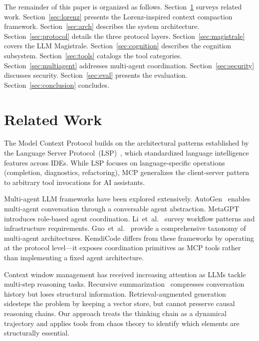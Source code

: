 \documentclass[journal,10pt]{IEEEtran}
\begin{document}
The remainder of this paper is organized as follows. Section~\ref{sec:related} surveys related work. Section~\ref{sec:lorenz} presents the Lorenz-inspired context compaction framework. Section~\ref{sec:arch} describes the system architecture. Section~\ref{sec:protocol} details the three protocol layers. Section~\ref{sec:magistrale} covers the LLM Magistrale. Section~\ref{sec:cognition} describes the cognition subsystem. Section~\ref{sec:tools} catalogs the tool categories. Section~\ref{sec:multiagent} addresses multi-agent coordination. Section~\ref{sec:security} discusses security. Section~\ref{sec:eval} presents the evaluation. Section~\ref{sec:conclusion} concludes.

\section{Related Work}
\label{sec:related}

The Model Context Protocol builds on the architectural patterns established by the Language Server Protocol~(LSP)~\cite{lsp2016}, which standardized language intelligence features across IDEs. While LSP focuses on language-specific operations (completion, diagnostics, refactoring), MCP generalizes the client-server pattern to arbitrary tool invocations for AI assistants.

Multi-agent LLM frameworks have been explored extensively. AutoGen~\cite{wu2023autogen} enables multi-agent conversation through a conversable agent abstraction. MetaGPT~\cite{hong2023metagpt} introduces role-based agent coordination. Li~et~al.~\cite{li2024multiagent} survey workflow patterns and infrastructure requirements. Guo~et~al.~\cite{guo2024ijcai} provide a comprehensive taxonomy of multi-agent architectures. KemdiCode differs from these frameworks by operating at the protocol level---it exposes coordination primitives as MCP tools rather than implementing a fixed agent architecture.

Context window management has received increasing attention as LLMs tackle multi-step reasoning tasks. Recursive summarization~\cite{wu2021recursively} compresses conversation history but loses structural information. Retrieval-augmented generation~\cite{lewis2020rag} sidesteps the problem by keeping a vector store, but cannot preserve causal reasoning chains. Our approach treats the thinking chain as a dynamical trajectory and applies tools from chaos theory to identify which elements are structurally essential.
\end{document}
